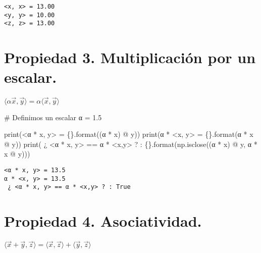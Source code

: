 \documentclass[
  letterpaper,
  DIV=11,
  numbers=noendperiod]{scrreprt}
\newenvironment{Shaded}{\begin{snugshade}}{\end{snugshade}}
\newcommand{\BuiltInTok}[1]{\textcolor[rgb]{0.00,0.23,0.31}{#1}}
\newcommand{\CommentTok}[1]{\textcolor[rgb]{0.37,0.37,0.37}{#1}}
\newcommand{\FloatTok}[1]{\textcolor[rgb]{0.68,0.00,0.00}{#1}}
\newcommand{\NormalTok}[1]{\textcolor[rgb]{0.00,0.23,0.31}{#1}}
\newcommand{\OperatorTok}[1]{\textcolor[rgb]{0.37,0.37,0.37}{#1}}
\newcommand{\SpecialCharTok}[1]{\textcolor[rgb]{0.37,0.37,0.37}{#1}}
\newcommand{\StringTok}[1]{\textcolor[rgb]{0.13,0.47,0.30}{#1}}
\begin{document}
\begin{verbatim}
<x, x> = 13.00
<y, y> = 10.00
<z, z> = 13.00
\end{verbatim}

\section{Propiedad 3. Multiplicación por un
escalar.}\label{propiedad-3.-multiplicaciuxf3n-por-un-escalar.}

\(\langle \alpha \vec{x}, \vec{y} \rangle = \alpha \langle \vec{x}, \vec{y} \rangle\)

\begin{Shaded}
\begin{Highlighting}[]
\CommentTok{\# Definimos un escalar}
\NormalTok{α }\OperatorTok{=} \FloatTok{1.5}

\BuiltInTok{print}\NormalTok{(}\StringTok{\textquotesingle{}\textless{}α * x, y\textgreater{} = }\SpecialCharTok{\{\}}\StringTok{\textquotesingle{}}\NormalTok{.}\BuiltInTok{format}\NormalTok{((α }\OperatorTok{*}\NormalTok{ x) }\OperatorTok{@}\NormalTok{ y))}
\BuiltInTok{print}\NormalTok{(}\StringTok{\textquotesingle{}α * \textless{}x, y\textgreater{} = }\SpecialCharTok{\{\}}\StringTok{\textquotesingle{}}\NormalTok{.}\BuiltInTok{format}\NormalTok{(α }\OperatorTok{*}\NormalTok{ x }\OperatorTok{@}\NormalTok{ y))}
\BuiltInTok{print}\NormalTok{(}\StringTok{\textquotesingle{} ¿ \textless{}α * x, y\textgreater{} == α * \textless{}x,y\textgreater{} ? : }\SpecialCharTok{\{\}}\StringTok{\textquotesingle{}}\NormalTok{.}\BuiltInTok{format}\NormalTok{(np.isclose((α }\OperatorTok{*}\NormalTok{ x) }\OperatorTok{@}\NormalTok{ y, α }\OperatorTok{*}\NormalTok{ x }\OperatorTok{@}\NormalTok{ y)))}
\end{Highlighting}
\end{Shaded}

\begin{verbatim}
<α * x, y> = 13.5
α * <x, y> = 13.5
 ¿ <α * x, y> == α * <x,y> ? : True
\end{verbatim}

\section{Propiedad 4. Asociatividad.}\label{propiedad-4.-asociatividad.}

\(\langle \vec{x}+\vec{y}, \vec{z} \rangle = \langle \vec{x}, \vec{z} \rangle + \langle \vec{y}, \vec{z} \rangle\)
\end{document}

